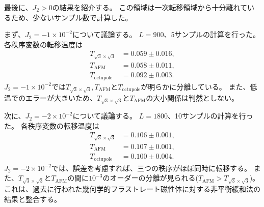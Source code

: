 \documentclass[12pt,titlepage,dvipdfmx]{jarticle}
\begin{document}
\newpage

最後に、$J_2>0$の結果を紹介する。
この領域は一次転移領域から十分離れているため、少ないサンプル数で計算した。

まず、$J_2=-1\times10^{-2}$について議論する。
$L=900$、5サンプルの計算を行った。
各秩序変数の転移温度は
\begin{align}
   T_{\sqrt{3}\times\sqrt{3}} &= 0.059 \pm 0.016, \\ 
   T_{\mathrm{AFM}}           &= 0.058 \pm 0.011, \\
   T_{\mathrm{octupole}}      &= 0.092 \pm 0.003. 
\end{align}
$J_2=-1\times10^{-2}$では$T_{\sqrt{3}\times\sqrt{3}},T_{\mathrm{AFM}}$と$T_{\mathrm{octupole}}$が明らかに分離している。
また、低温でのエラーが大きいため、$T_{\sqrt{3}\times\sqrt{3}}$と$T_{\mathrm{AFM}}$の大小関係は判然としない。


次に、$J_2=-2\times10^{-2}$について議論する。
$L=1800$、10サンプルの計算を行った。
各秩序変数の転移温度は
\begin{align}
   T_{\sqrt{3}\times\sqrt{3}} &= 0.106 \pm 0.001, \\
   T_{\mathrm{AFM}}           &= 0.107 \pm 0.001, \\
   T_{\mathrm{octupole}}      &= 0.100 \pm 0.004. 
\end{align}
$J_2=-2\times10^{-2}$では、誤差を考慮すれば、三つの秩序がほぼ同時に転移する。
また、$T_{\sqrt{3}\times\sqrt{3}}$と$T_{\mathrm{AFM}}$の間に$10^{-3}$のオーダーの分離が見られる($T_{\mathrm{AFM}}>T_{\sqrt{3}\times\sqrt{3}}$)。
これは、過去に行われた幾何学的フラストレート磁性体に対する非平衡緩和法の結果\cite{Misawa2010}と整合する。
\end{document}
